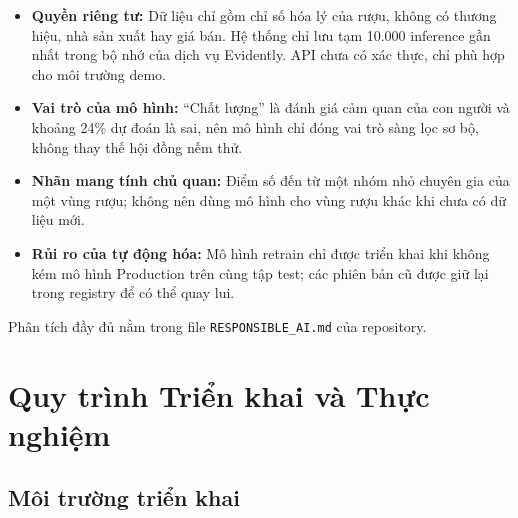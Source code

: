 \documentclass[12pt,a4paper]{report}
\begin{document}
\begin{itemize}
  \item \textbf{Quyền riêng tư:} Dữ liệu chỉ gồm chỉ số hóa lý của rượu, không có thương hiệu, nhà sản xuất hay giá bán. Hệ thống chỉ lưu tạm 10.000 inference gần nhất trong bộ nhớ của dịch vụ Evidently. API chưa có xác thực, chỉ phù hợp cho môi trường demo.
  \item \textbf{Vai trò của mô hình:} ``Chất lượng'' là đánh giá cảm quan của con người và khoảng 24\% dự đoán là sai, nên mô hình chỉ đóng vai trò sàng lọc sơ bộ, không thay thế hội đồng nếm thử.
  \item \textbf{Nhãn mang tính chủ quan:} Điểm số đến từ một nhóm nhỏ chuyên gia của một vùng rượu; không nên dùng mô hình cho vùng rượu khác khi chưa có dữ liệu mới.
  \item \textbf{Rủi ro của tự động hóa:} Mô hình retrain chỉ được triển khai khi không kém mô hình Production trên cùng tập test; các phiên bản cũ được giữ lại trong registry để có thể quay lui.
\end{itemize}

Phân tích đầy đủ nằm trong file \texttt{RESPONSIBLE\_AI.md} của repository.

\chapter{Quy trình Triển khai và Thực nghiệm}

\section{Môi trường triển khai}
\end{document}
